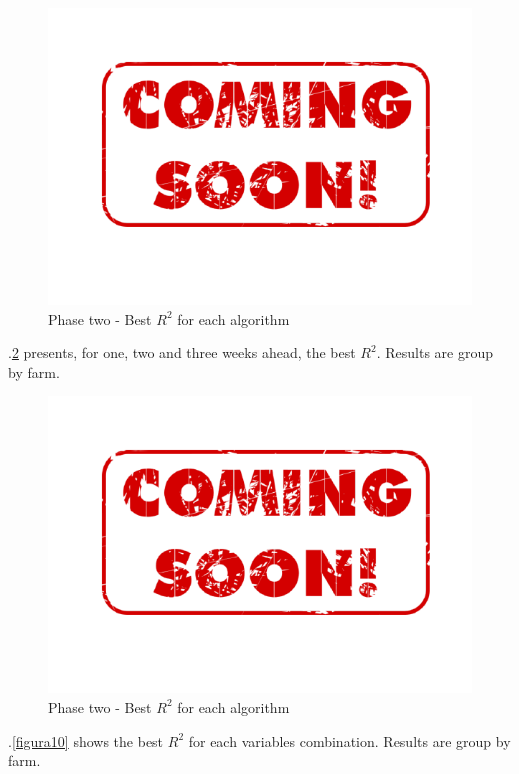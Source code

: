 \documentclass[review]{elsarticle}
\begin{document}
\begin{figure}[H] 
 \centering
 \includegraphics[scale=.5]{coming}
 \caption{Phase two - Best $R^2$ for each algorithm} 
 \label{figura8} 
\end{figure}

\figurename $.$\ref{figura9} presents, for one, two and three weeks ahead, the best $R^2$. Results are group by farm.

\begin{figure}[H] 
 \centering
 \includegraphics[scale=.5]{coming}
 \caption{Phase two - Best $R^2$ for each algorithm} 
 \label{figura9} 
\end{figure}

\figurename $.$\ref{figura10} shows the best $R^2$ for each variables combination. Results are group by farm.
\end{document}
